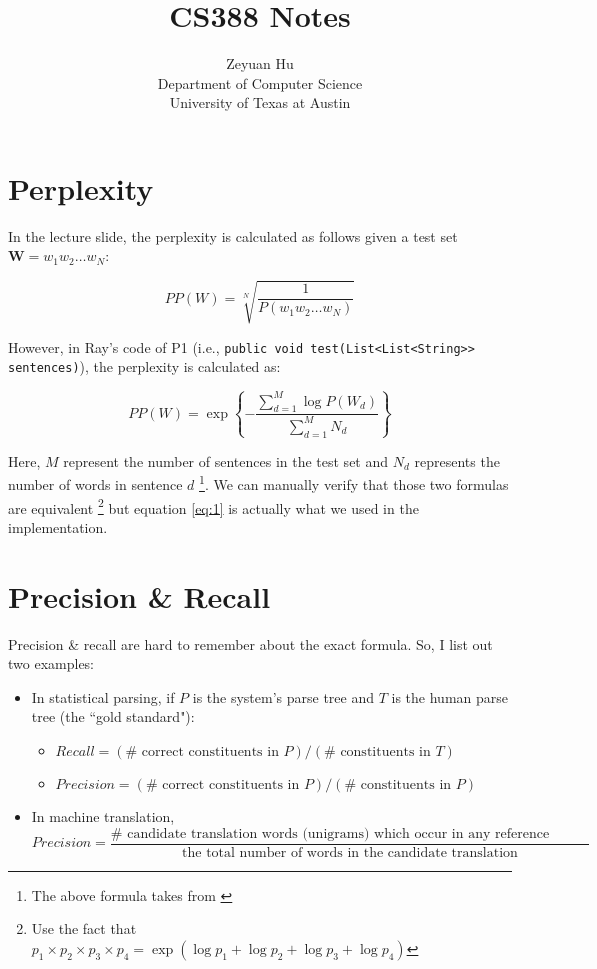 \documentclass[12pt]{article}
\begin{document}
\date{}

 
\title{CS388 Notes}
\author{Zeyuan Hu\\
Department of Computer Science\\
University of Texas at Austin} 
 
\maketitle
\tableofcontents
\setcounter{secnumdepth}{3}
\section{Perplexity}

In the lecture slide, the perplexity is calculated as follows
given a test set $\textbf{W} = w_1w_2 \dots w_N$:

\begin{equation}
PP(W) = \sqrt[N]{\frac{1}{P(w_1w_2\dots w_N)}}
\end{equation}

However, in Ray's code of P1 (i.e., \texttt{public void test(List<List<String>> sentences)}),
the perplexity is calculated as:

\begin{equation} \label{eq:1}
PP(W) = \exp \left\{-\frac{\sum_{d=1}^{M}\log P(W_d)}{\sum_{d=1}^{M}N_d}\right\}
\end{equation}


Here, $M$ represent the number of sentences in the test set and $N_d$ represents the number of
words in sentence $d$ \footnote{The above formula takes from \cite{blei2003latent}}. We can 
manually verify that those two formulas are equivalent \footnote{Use the fact that $p_1 \times p_2 \times p_3 \times p_4 = \exp(\log p_1 + \log p_2 + \log p_3 + \log p_4)$} but equation \ref{eq:1} is actually what we
used in the implementation.

\section{Precision \& Recall}

Precision \& recall are hard to remember about the exact formula. So, I list out two examples:

\begin{itemize}
\item In statistical parsing, if $P$ is the system's parse tree and $T$ is the human parse tree (the ``gold standard"):
	\begin{itemize}
	\item $Recall = (\# \text{ correct constituents in }P) / (\# \text{ constituents in }T)$
	\item $Precision = (\# \text{ correct constituents in }P) / (\# \text{ constituents in }P)$
	\end{itemize}
\item In machine translation, 
$$
Precision = \frac{\# \text{ candidate translation words (unigrams) which occur in any reference translation}}{
{\text{the total number of words in the candidate translation}}}
$$
\end{itemize}
\end{document}
